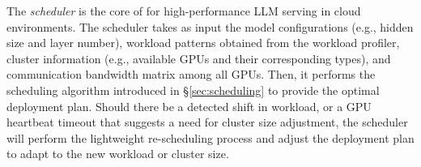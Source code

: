 The \textit{scheduler} is the core of \sys for high-performance LLM serving in cloud environments.  
The scheduler takes as input the model configurations (e.g., hidden size and layer number), workload patterns obtained from the workload profiler, cluster information (e.g., available GPUs and their corresponding types), and communication bandwidth matrix among all GPUs. Then, it performs the scheduling algorithm introduced in \S\ref{sec:scheduling} to provide the optimal deployment plan. 
Should there be a detected shift in workload, or a GPU heartbeat timeout that suggests a need for cluster size adjustment, the scheduler will perform the lightweight re-scheduling process and adjust the deployment plan to adapt to the new workload or cluster size. 



